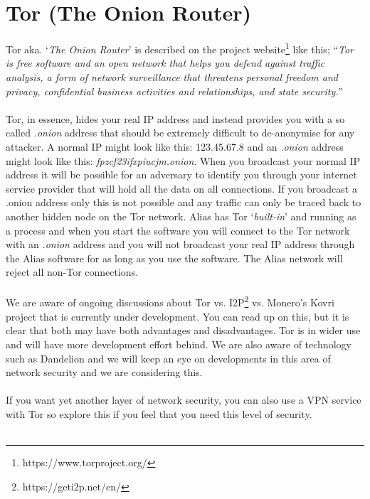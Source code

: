 \section{Tor (The Onion Router)}
Tor aka. ‘\textit{The Onion Router}’ is described on the project
website\footnote{https://www.torproject.org/ } like this; “\textit{Tor is
free software and an open network that helps you defend against traffic
analysis, a form of network surveillance that threatens personal freedom
and privacy, confidential business activities and relationships, and
state security.}”
\\
\\
\noindent
Tor, in essence, hides your real IP address and instead provides you with
a so called \textit{.onion} address that should be extremely difficult to
de-anonymise for any attacker. A normal IP might look like this: 123.45.67.8
and an \textit{.onion} address might look like this:
\textit{fpzcf23ifxpiucjm.onion}. When you broadcast your normal IP address
it will be possible for an adversary to identify you through your internet
service provider that will hold all the data on all connections. If you
broadcast a .onion address only this is not possible and any traffic can
only be traced back to another hidden node on the Tor network. Alias
has Tor ‘\textit{built-in}’ and running as a process and when you start the
software you will connect to the Tor network with an \textit{.onion} address
and you will not broadcast your real IP address through the Alias
software for as long as you use the software. The Alias network will
reject all non-Tor connections.
\\
\\
\noindent
We are aware of ongoing discussions about Tor vs. I2P\footnote{https://geti2p.net/en/}
vs. Monero’s Kovri project that is currently under development. You can
read up on this, but it is clear that both may have both advantages and
disadvantages. Tor is in wider use and will have more development effort
behind. We are also aware of technology such as Dandelion and we will keep
an eye on developments in this area of network security and we are
considering this.
\\
\\
\noindent
If you want yet another layer of network security, you can also use a VPN
service with Tor so explore this if you feel that you need this level of
security.
\\
\\
